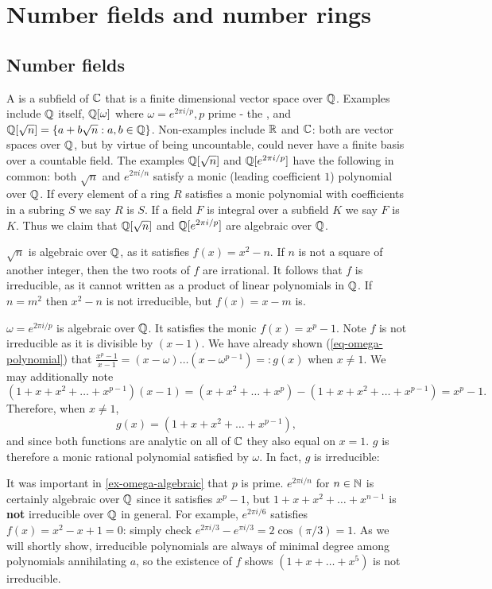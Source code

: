 \chapter{Number fields and number rings}
\section{Number fields}
A  is a subfield of $\mathbb{C}$ that is a finite dimensional vector space over $\mathbb{Q}$. Examples include $\mathbb{Q}$ itself, $\mathbb{Q}[\omega]$ where $\omega=e^{2\pi i/p},p$ prime - the , and $\mathbb{Q}[\sqrt{n}]=\{a+b\sqrt{n}:a,b\in \mathbb{Q}\}$. Non-examples include $\mathbb{R}$ and $\mathbb{C}$: both are vector spaces over $\mathbb{Q}$, but by virtue of being uncountable, could never have a finite basis over a countable field. The examples $\mathbb{Q}[\sqrt{n}]$ and $\mathbb{Q}[e^{2\pi i/p}]$ have the following in common: both $\sqrt{n}$ and $e^{2\pi i/n}$ satisfy a monic (leading coefficient $1$) polynomial over $\mathbb{Q}$. If every element of a ring $R$ satisfies a monic polynomial with coefficients in a subring $S$ we say $R$ is  $S$. If a field $F$ is integral over a subfield $K$ we say $F$ is  $K$. Thus we claim that $\mathbb{Q}[\sqrt{n}]$ and $\mathbb{Q}[e^{2\pi i/p}]$ are algebraic over $\mathbb{Q}$.

\begin{example}\label{ex-sqrt-n-algebraic}
$\sqrt{n}$ is algebraic over $\mathbb{Q}$, as it satisfies $f(x)=x^2-n$. If $n$ is not a square of another integer, then the two roots of $f$ are irrational. It follows that $f$ is irreducible, as it cannot written as a product of linear polynomials in $\mathbb{Q}$. If $n=m^2$ then $x^2-n$ is not irreducible, but $f(x)=x-m$ is.
\end{example}
\begin{example}\label{ex-omega-algebraic}
$\omega=e^{2\pi i/p}$ is algebraic over $\mathbb{Q}$. It satisfies the monic $f(x)=x^p-1$. Note $f$ is not irreducible as it is divisible by $(x-1)$. We have already shown (\cref{eq-omega-polynomial}) that $\frac{x^p-1}{x-1}=(x-\omega)\dots(x-\omega^{p-1})=:g(x)$ when $x\neq 1$.
We may additionally note
$$(1+x+x^2+\dots+x^{p-1})(x-1)=(x+x^2+\dots+x^p)-(1+x+x^2+\dots+x^{p-1})=x^p-1.$$
Therefore, 
when $x\neq 1$,
$$g(x)=(1+x+x^2+\dots+x^{p-1}),$$
and since both functions are analytic on all of $\mathbb{C}$ they also equal on $x=1$. $g$ is therefore a monic rational polynomial satisfied by $\omega$. In fact, $g$ is irreducible: 
\end{example}

\begin{remark}
It was important in \cref{ex-omega-algebraic} that $p$ is prime. $e^{2\pi i/n}$ for $n\in \mathbb{N}$ is certainly algebraic over $\mathbb{Q}$ since it satisfies $x^p-1$, but $1+x+x^2+\dots+x^{n-1}$ is \textbf{not} irreducible over $\mathbb{Q}$ in general. For example, $e^{2\pi i/6}$ satisfies $f(x)=x^2-x+1=0$: simply check $e^{2\pi i/3}-e^{\pi i/3}=2\cos(\pi/3)=1$. As we will shortly show, irreducible polynomials are always of minimal degree among polynomials annihilating $a$, so the existence of $f$ shows $(1+x+\dots+x^{5})$ is not irreducible.
\end{remark}

